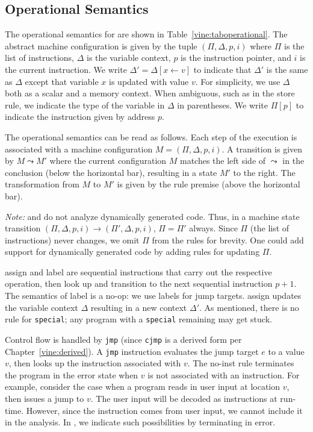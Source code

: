 \subsection{Operational Semantics}
\label{vine:operational}



The operational semantics for \bil are shown in
Table~\ref{vine:taboperational}.  The abstract machine configuration
is given by the tuple $(\Pi, \Delta, p, i)$ where $\Pi$ is the list of
instructions, $\Delta$ is the variable context, $p$ is the instruction
pointer, and $i$ is the current instruction.  We write $\Delta' =
\Delta[x \leftarrow v]$ to indicate that $\Delta'$ is the same as
$\Delta$ except that variable $x$ is updated with value $v$.  For
simplicity, we use $\Delta$ both as a scalar and a memory context. When
ambiguous, such as in the {\sc store} rule, we indicate the type of
the variable in $\Delta$ in parentheses. We write $\Pi[p]$ to indicate
the instruction given by address $p$.

The operational semantics can be read as follows.  Each step of the
execution is associated with a machine configuration $M = (\Pi,
\Delta, p, i)$.  A transition is given by $M \leadsto M'$ where the
current configuration $M$ matches the left side of $\leadsto$ in the
conclusion (below the horizontal bar), resulting in a state $M'$ to
the right.  The transformation from $M$ to $M'$ is given by the rule
premise (above the horizontal bar). 

{\it Note:} \bap and \bil do not analyze dynamically generated
code. Thus, in a machine state transition $(\Pi, \Delta, p, i)
\rightarrow (\Pi', \Delta, p, i)$, $\Pi = \Pi'$ always. Since $\Pi$
(the list of instructions) never changes, we omit $\Pi$ from the rules
for brevity. One could add support for dynamically generated code by
adding rules for updating $\Pi$. 


{\sc assign} and {\sc label} are sequential instructions that carry
out the respective operation, then look up and transition to the next
sequential instruction $p+1$. The semantics of {\sc label} is a no-op:
we use labels for jump targets.  {\sc assign} updates the variable
context $\Delta$ resulting in a new context $\Delta'$.  As mentioned,
there is no rule for {\tt special}; any program with a {\tt special}
remaining may get stuck.

Control flow is handled by {\tt jmp} (since {\tt cjmp} is a derived
form per Chapter~\ref{vine:derived}). A {\tt jmp} instruction
evaluates the jump target $e$ to a value $v$, then looks up the
instruction associated with $v$.  The {\sc no-inst} rule terminates
the program in the error state when $v$ is not associated with an
instruction. For example, consider the case when a program reads in
user input at location $v$, then issues a jump to $v$.  The user input
will be decoded as instructions at run-time.  However, since the
instruction comes from user input, we cannot include it in the analysis. In
\bap, we indicate such possibilities by terminating in error.




%
